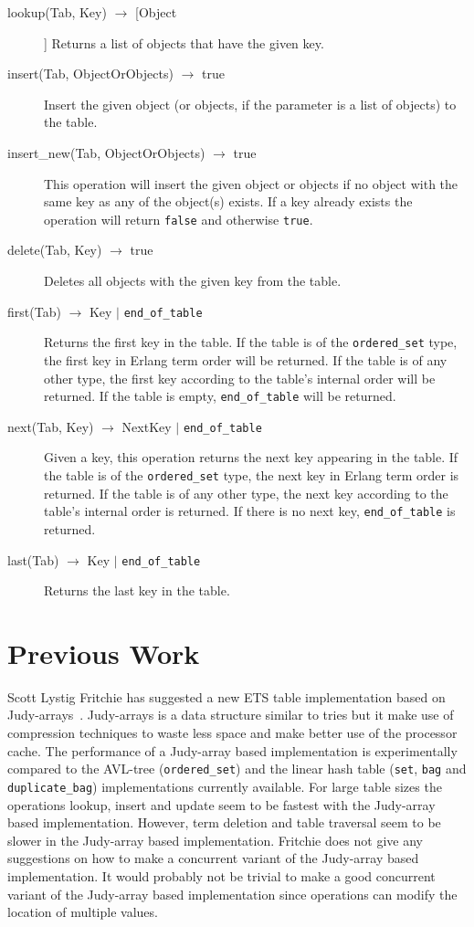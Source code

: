 \documentclass[aps,pre,preprint,nofootinbib]{revtex4}
\begin{document}
\begin{description}
 \item[lookup(Tab, Key) $\rightarrow$ [Object]]
 Returns a list of objects that have the given key.
 \item[insert(Tab, ObjectOrObjects) $\rightarrow$ true]
 Insert the given object (or objects, if the parameter is a list of objects) to the table.
 \item[insert\_new(Tab, ObjectOrObjects) $\rightarrow$ true]
 This operation will insert the given object or objects if no object with the same key as any of the object(s) exists.
 If a key already exists the operation will return \verb|false| and otherwise \verb|true|.
 \item[delete(Tab, Key) $\rightarrow$ true]
   Deletes all objects with the given key from the table.
 \item[first(Tab) $\rightarrow$ Key $|$ \texttt{end\_of\_table} ]
   Returns the first key in the table.
   If the table is of the \verb|ordered_set| type, the first key in Erlang term order will be returned.
   If the table is of any other type, the first key according to the table's internal order will be returned.
   If the table is empty, \verb|end_of_table| will be returned.
\item[next(Tab, Key) $\rightarrow$ NextKey $|$ \texttt{end\_of\_table} ]
  Given a key, this operation returns the next key appearing in the table.
  If the table is of the \verb|ordered_set| type, the next key in Erlang term order is returned.
  If the table is of any other type, the next key according to the table's internal order is returned.
  If there is no next key, \texttt{end\_of\_table} is returned.
 \item[last(Tab) $\rightarrow$ Key $|$ \texttt{end\_of\_table} ] Returns the last key in the table.
\end{description}

\section{Previous Work}

  Scott Lystig Fritchie has suggested a new ETS table implementation based on Judy-arrays~\cite{ScottEtsJudy}.
  Judy-arrays is a data structure similar to tries but it make use of compression techniques to waste less space and make better use of the processor cache.
  The performance of a Judy-array based implementation is experimentally compared to the AVL-tree (\verb|ordered_set|) and the linear hash table (\verb|set|, \verb|bag| and \verb|duplicate_bag|) implementations currently available.
  For large table sizes the operations lookup, insert and update seem to be fastest with the Judy-array based implementation.
  However, term deletion and table traversal seem to be slower in the Judy-array based implementation.
  Fritchie does not give any suggestions on how to make a concurrent variant of the Judy-array based implementation.
  It would probably not be trivial to make a good concurrent variant of the Judy-array based implementation since operations can modify the location of multiple values.
\end{document}
